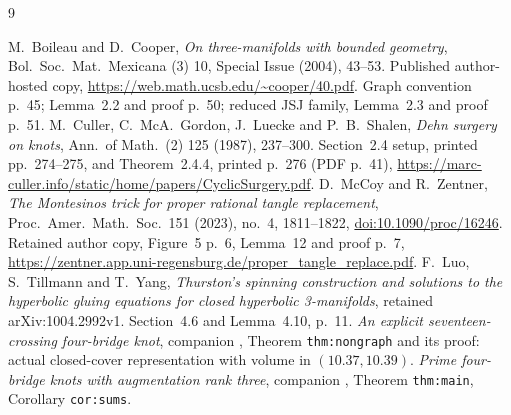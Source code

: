 \documentclass[11pt]{article}
\begin{document}
\begin{thebibliography}{9}\small\raggedright
{} M.~Boileau and D.~Cooper,
\emph{On three-manifolds with bounded geometry},
Bol.~Soc.~Mat.~Mexicana (3) 10, Special Issue (2004), 43--53.
Published author-hosted copy,
\url{https://web.math.ucsb.edu/~cooper/40.pdf}.
Graph convention p.~45; Lemma~2.2 and proof p.~50;
reduced JSJ family, Lemma~2.3 and proof p.~51.
 M.~Culler, C.~McA.~Gordon, J.~Luecke and P.~B.~Shalen,
\emph{Dehn surgery on knots}, Ann.~of Math.~(2) 125 (1987), 237--300.
Section~2.4 setup, printed pp.~274--275, and Theorem~2.4.4,
printed p.~276 (PDF p.~41),
\url{https://marc-culler.info/static/home/papers/CyclicSurgery.pdf}.
 D.~McCoy and R.~Zentner,
\emph{The Montesinos trick for proper rational tangle replacement},
Proc.~Amer.~Math.~Soc.~151 (2023), no.~4, 1811--1822,
\href{https://doi.org/10.1090/proc/16246}{doi:10.1090/proc/16246}.
Retained author copy, Figure~5 p.~6, Lemma~12 and proof p.~7,
\url{https://zentner.app.uni-regensburg.de/proper_tangle_replace.pdf}.
 F.~Luo, S.~Tillmann and T.~Yang,
\emph{Thurston's spinning construction and solutions to the hyperbolic
gluing equations for closed hyperbolic 3-manifolds},
retained arXiv:1004.2992v1. Section~4.6 and Lemma~4.10, p.~11.
 \emph{An explicit seventeen-crossing four-bridge knot},
companion ,
Theorem \texttt{thm:nongraph} and its proof: actual closed-cover
representation with volume in $(10.37,10.39)$.
 \emph{Prime four-bridge knots with augmentation rank
three}, companion ,
Theorem \texttt{thm:main}, Corollary \texttt{cor:sums}.
\end{thebibliography}
\end{document}
